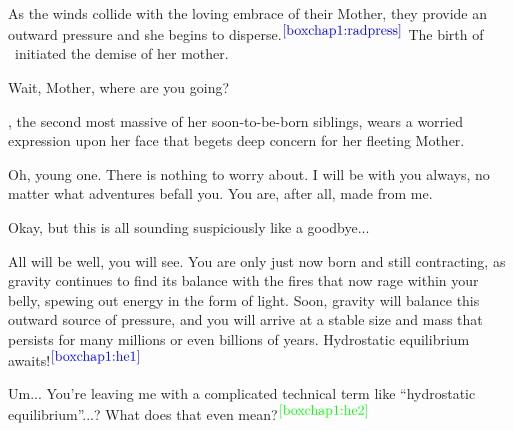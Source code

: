 \documentclass[main.tex]{subfiles}
\begin{document}
\par \nar As the winds collide with the loving embrace of their Mother, they provide an outward pressure and she begins to disperse.$^{\textcolor{blue}{{\ref{boxchap1:radpress}}}}$ The birth of \rmmaia~initiated the demise of her mother.  

\par \Maia Wait, Mother, where are you going?  

\par \nar \rmmaia, the second most massive of her soon-to-be-born siblings, wears a worried expression upon her face that begets deep concern for her fleeting Mother.  





\par \Pleione Oh, young one.  There is nothing to worry about.  I will be with you always, no matter what adventures befall you.  You are, after all, made from me.  

\par \Maia Okay, but this is all sounding suspiciously like a goodbye...

\par \Pleione All will be well, you will see.  You are only just now born and still contracting, as gravity continues to find its balance with the fires that now rage within your belly, spewing out energy in the form of light.  Soon, gravity will balance this outward source of pressure, and you will arrive at a stable size and mass that persists for many millions or even billions of years. Hydrostatic equilibrium awaits!$^{\textcolor{blue}{{\ref{boxchap1:he1}}}}$

\par \Maia Um... You're leaving me with a complicated technical term like ``hydrostatic equilibrium''...?  What does that even mean?$^{\textcolor{green}{{\ref{boxchap1:he2}}}}$
\end{document}
